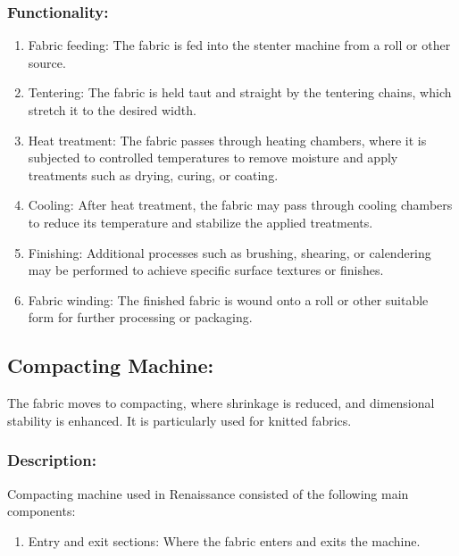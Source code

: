 \subsubsection{Functionality:}

\begin{enumerate}
\item
  Fabric feeding: The fabric is fed into the stenter machine from a roll
  or other source.
\item
  Tentering: The fabric is held taut and straight by the tentering
  chains, which stretch it to the desired width.
\item
  Heat treatment: The fabric passes through heating chambers, where it
  is subjected to controlled temperatures to remove moisture and apply
  treatments such as drying, curing, or coating.
\item
  Cooling: After heat treatment, the fabric may pass through cooling
  chambers to reduce its temperature and stabilize the applied
  treatments.
\item
  Finishing: Additional processes such as brushing, shearing, or
  calendering may be performed to achieve specific surface textures or
  finishes.
\item
  Fabric winding: The finished fabric is wound onto a roll or other
  suitable form for further processing or packaging.
\end{enumerate}



\subsection{Compacting Machine:}

The fabric moves to compacting, where shrinkage is reduced, and dimensional stability is enhanced.
It is particularly used for knitted fabrics.


\subsubsection{Description:}


Compacting machine used in Renaissance consisted of the following main
components:


\begin{enumerate}
\item
  Entry and exit sections: Where the fabric enters and exits the
  machine.
\end{enumerate}




